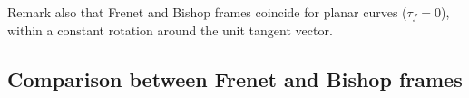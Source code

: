 Remark also that Frenet and Bishop frames coincide for planar curves ($\tau_f = 0$), within a constant rotation around the unit tangent vector.
 



\subsection{Comparison between Frenet and Bishop frames}

